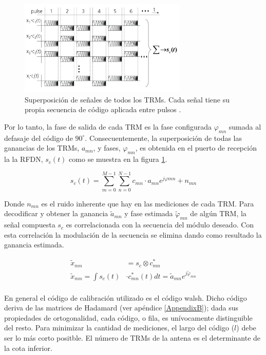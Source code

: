 \begin{figure}
 \centering
 \includegraphics[width=8cm]{gfx/superposition_signals_classic.png}
 \caption{Superposición de señales de todos los TRMs. Cada señal tiene su propia secuencia de código aplicada entre pulsos \cite{Br2007}.}
 \label{fig:sup_sign_classic}
\end{figure}

Por lo tanto, la fase de salida de cada TRM es la fase configurada $\varphi_{mn}$ sumada al defasaje del código de 
$90^{\circ}$. Consecuentemente, la superposición de todas las ganancias de los TRMs, $a_{mn}$, y fases, $\varphi_{mn}$,
es obtenida en el puerto de recepción la la RFDN, $s_c(t)$ como se muestra en la figura \ref{fig:sup_sign_classic}.

\begin{equation}
	s_c(t) = \sum_{m=0}^{M-1}\sum_{n=0}^{N-1}c_{mn}\cdot a_{mn}e^{j\varphi{mn}} + n_{mn}
\end{equation}

Donde $n_{mn}$ es el ruido inherente que hay en las mediciones de cada TRM. Para decodificar y obtener la ganancia 
$\tilde{a}_{mn}$ y fase estimada $\tilde\varphi_{mn}$ de algún TRM, la señal compuesta $s_c$ es correlacionada con 
la secuencia del módulo deseado. Con esta correlación la modulación de la secuencia se elimina dando como resultado
la ganancia estimada.

\begin{equation}
\begin{aligned}
	\tilde{x}_{mn} &= s_c \otimes c^*_{mn} \\
	\tilde{x}_{mn} = \int s_c(t) &\cdot c^*_{mn}(t) dt = \tilde{a}_{mn}e^{j\tilde{\varphi}_{mn}} \\
\end{aligned}
\label{eq:classic_correlation}
\end{equation}

En general el código de calibración utilizado es el código walsh. Dicho código deriva de las matrices de Hadamard (ver 
apéndice \ref{AppendixB}); dada sus propiedades de ortogonalidad, cada código, o fila, es unívocamente distinguible del 
resto. Para minimizar la cantidad de mediciones, el largo del código ($l$) debe ser lo más corto positble. El número de 
TRMs de la antena es el determinante de la cota inferior.

